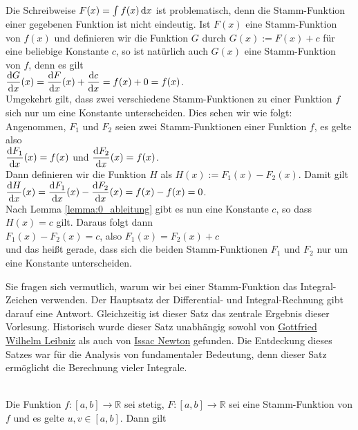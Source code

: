 Die Schreibweise $F(x) = \int f(x) \, \textrm{d} x$ ist problematisch, denn die Stamm-Funktion einer
gegebenen Funktion ist nicht eindeutig.  Ist $F(x)$ eine Stamm-Funktion von $f(x)$ und
definieren wir die Funktion $G$ durch $G(x) := F(x) + c$ f\"ur eine beliebige Konstante $c$,
so ist nat\"urlich auch $G(x)$ eine Stamm-Funktion von $f$, denn es gilt
\\[0.2cm]
\hspace*{1.3cm}
$\displaystyle\frac{\textrm{d}G}{\textrm{d}x}(x) = \displaystyle\frac{\textrm{d}F}{\textrm{d}x}(x) + \displaystyle\frac{\textrm{d}c}{\textrm{d}x} = f(x) + 0 = f(x)$.
\\[0.2cm]
Umgekehrt gilt, dass zwei verschiedene Stamm-Funktionen zu einer Funktion $f$ sich nur um
eine Konstante unterscheiden.  Dies sehen wir wie folgt: Angenommen, $F_1$ und $F_2$ seien
zwei Stamm-Funktionen einer Funktion $f$, es gelte also 
\\[0.2cm]
\hspace*{1.3cm}
$\displaystyle\frac{\textrm{d}F_1}{\textrm{d}x}(x) = f(x)$ \quad und \quad $\displaystyle\frac{\textrm{d}F_2}{\textrm{d}x}(x) = f(x)$.
\\[0.2cm]
Dann definieren wir die Funktion $H$ als $H(x) := F_1(x) - F_2(x)$.  Damit gilt
\\[0.2cm]
\hspace*{1.3cm}
$\displaystyle\frac{\textrm{d}H}{\textrm{d}x}(x) = \displaystyle\frac{\textrm{d}F_1}{\textrm{d}x}(x) - \displaystyle\frac{\textrm{d}F_2}{\textrm{d}x}(x) = f(x) - f(x) = 0$.
\\[0.2cm]
Nach Lemma \ref{lemma:0_ableitung} gibt es nun eine Konstante $c$, so dass $H(x) = c$ gilt.
Daraus folgt dann
\\[0.2cm]
\hspace*{1.3cm}
$F_1(x) - F_2(x) = c$, \quad also \quad $F_1(x) = F_2(x) + c$
\\[0.2cm]
und das hei{\ss}t gerade, dass sich die beiden Stamm-Funktionen $F_1$ und $F_2$ nur um eine Konstante
unterscheiden.   

Sie fragen sich vermutlich, warum wir bei einer Stamm-Funktion das Integral-Zeichen verwenden.
Der Hauptsatz der Differential- und Integral-Rechnung gibt darauf eine Antwort.  Gleichzeitig ist
dieser Satz das zentrale Ergebnis dieser Vorlesung.  Historisch wurde dieser Satz unabh\"angig sowohl
von \href{https://en.wikipedia.org/wiki/Gottfried_Wilhelm_Leibniz}{Gottfried Wilhelm Leibniz} als
auch von \href{https://en.wikipedia.org/wiki/Isaac_Newton}{Issac Newton} gefunden.  Die Entdeckung
dieses Satzes war f\"ur die Analysis von  fundamentaler Bedeutung, denn dieser Satz erm\"oglicht die
Berechnung vieler Integrale.

\begin{Satz} \hspace*{\fill} \\
 Die Funktion $f:[a,b] \rightarrow\mathbb{R}$ sei stetig, $F:[a,b] \rightarrow\mathbb{R}$
sei eine Stamm-Funktion von $f$ und es gelte $u,v\in[a,b]$.  Dann gilt
\\[0.2cm]
\hspace*{1.3cm}
\colorbox{red}{\colorbox{orange}{}}  
\end{Satz}

